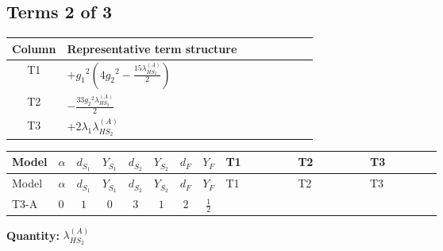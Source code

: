 \documentclass[8pt]{article}
\begin{document}
\begin{landscape}
\subsection*{Terms 2 of 3}
\begin{center}
\begin{tabular}{@{}c >{\raggedright\arraybackslash}p{0.82\linewidth}@{}}
\toprule
Column & Representative term structure \\
\midrule
T1 & \(\displaystyle +{g_1}^2 \left(4 {g_2}^2-\frac{15 {\lambda_{HS_2}^{(A)}}}{2}\right)\) \\
\midrule
T2 & \(\displaystyle -\frac{33 {g_2}^2 {\lambda_{HS_2}^{(A)}}}{2}\) \\
\midrule
T3 & \(\displaystyle +2 {\lambda_1} {\lambda_{HS_2}^{(A)}}\) \\
\midrule
\bottomrule
\end{tabular}
\end{center}
\smallskip
\tiny
\begin{longtable}{@{}llcccccc >{\raggedright\arraybackslash}p{0.21\linewidth} >{\raggedright\arraybackslash}p{0.21\linewidth} >{\raggedright\arraybackslash}p{0.21\linewidth}@{}}
\toprule
Model & $\alpha$ & $d_{S_1}$ & $Y_{S_1}$ & $d_{S_2}$ & $Y_{S_2}$ & $d_F$ & $Y_F$ & T1 & T2 & T3 \\
\midrule
\endfirsthead
\toprule
Model & $\alpha$ & $d_{S_1}$ & $Y_{S_1}$ & $d_{S_2}$ & $Y_{S_2}$ & $d_F$ & $Y_F$ & T1 & T2 & T3 \\
\midrule
\endhead
T3-A & $0$ & $1$ & $0$ & $3$ & $1$ & $2$ & $\frac{1}{2}$ & \scriptsize\adjustbox{max width=\linewidth}{$\begin{gathered} +{g_1}^2 \left(4 {g_2}^2-\frac{15 {\lambda_{HS_2}^{(A)}}}{2}\right)\end{gathered}$} & \scriptsize\adjustbox{max width=\linewidth}{$\begin{gathered} -\frac{33 {g_2}^2 {\lambda_{HS_2}^{(A)}}}{2}\end{gathered}$} & \scriptsize\adjustbox{max width=\linewidth}{$\begin{gathered} +2 {\lambda_1} {\lambda_{HS_2}^{(A)}}\end{gathered}$} \\
\midrule
\bottomrule
\end{longtable}
\clearpage
\noindent\textbf{Quantity: }$\lambda_{HS_2}^{(A)}$\par\smallskip

\end{landscape}
\end{document}
